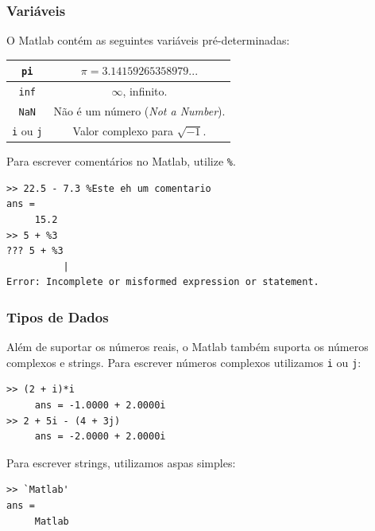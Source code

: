 \documentclass{beamer}
\begin{document}
\begin{frame}[fragile]
\frametitle{Vari\'aveis}

O Matlab cont\'em as seguintes vari\'aveis pr\'e-determinadas:

\begin{center}
\begin{tabular}{|c|c|}
\hline
{\tt pi} & $\pi = 3.14159265358979...$ \\ \hline
{\tt inf} & $\infty$, infinito. \\ \hline
{\tt NaN} & N\~ao \'e um n\'umero ({\it Not a Number}). \\ \hline
{\tt i} ou {\tt j} & Valor complexo para $\sqrt{-1}$. \\ \hline
\end{tabular}
\end{center}
\pause
Para escrever coment\'arios no Matlab, utilize {\tt \%}.{\small
\begin{verbatim}
>> 22.5 - 7.3 %Este eh um comentario
ans =
     15.2
>> 5 + %3
??? 5 + %3
          |
Error: Incomplete or misformed expression or statement.
\end{verbatim}
}
\end{frame}
\begin{frame}[fragile]

\frametitle{Tipos de Dados}

Al\'em de suportar os n\'umeros reais, o Matlab tamb\'em suporta os n\'umeros complexos e strings. Para escrever n\'umeros complexos utilizamos {\tt i} ou {\tt j}:
\pause
\begin{verbatim}
>> (2 + i)*i
     ans = -1.0000 + 2.0000i
>> 2 + 5i - (4 + 3j)
     ans = -2.0000 + 2.0000i
\end{verbatim}

\pause

Para escrever strings, utilizamos aspas simples:

\begin{verbatim}
>> `Matlab'
ans =
     Matlab
\end{verbatim}

\end{frame}
\end{document}

